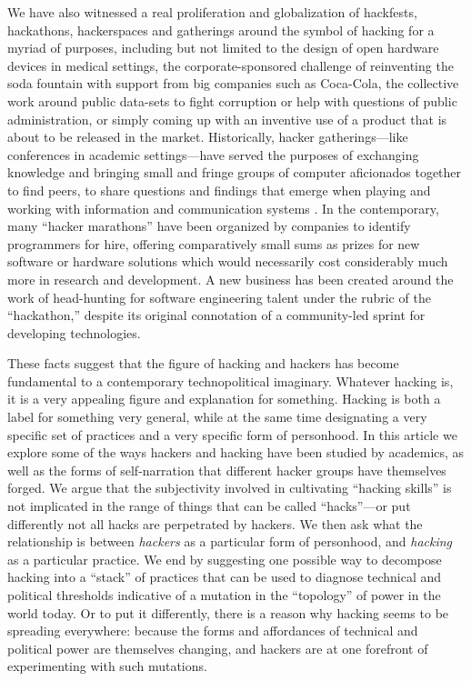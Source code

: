 \documentclass[10pt,letter,oneside]{scrartcl}
\begin{document}
We have also witnessed a real proliferation and globalization of hackfests,
hackathons, hackerspaces and gatherings around the symbol of hacking for a myriad of
purposes, including but not limited to the design of open hardware devices in
medical settings, the corporate-sponsored challenge of reinventing the soda
fountain with support from big companies such as Coca-Cola, the collective work
around public data-sets to fight corruption or help with questions of public
administration, or simply coming up with an inventive use of a product that is
about to be released in the market.  Historically, hacker gatherings---like
conferences in academic settings---have served the purposes of exchanging
knowledge and bringing small and fringe groups of computer aficionados together
to find peers, to share questions and findings that emerge when playing and
working with information and communication
systems \parencite{coleman_conference_2010}.  In the contemporary, many ``hacker
marathons'' have been organized by companies to identify programmers for hire,
offering comparatively small sums as prizes for new software or hardware
solutions which would necessarily cost considerably much more in research and
development.  A new business has been created around the work of head-hunting
for software engineering talent under the rubric of the ``hackathon,'' despite
its original connotation of a community-led sprint for developing technologies.

These facts suggest that the figure of hacking and hackers has become
fundamental to a contemporary technopolitical imaginary.  Whatever hacking is,
it is a very appealing figure and explanation for something.  Hacking is both a
label for something very general, while at the same time designating a very
specific set of practices and a very specific form of personhood.  In this
article we explore some of the ways hackers and hacking have been studied by
academics, as well as the forms of self-narration that different hacker groups
have themselves forged.  We argue that the subjectivity involved in cultivating
``hacking skills'' is not implicated in the range of things that can be called
``hacks''---or put differently not all hacks are perpetrated by hackers.  We
then ask what the relationship is between \emph{hackers} as a particular form of
personhood, and \emph{hacking} as a particular practice.  We end by suggesting
one possible way to decompose hacking into a ``stack'' of practices that can be
used to diagnose technical and political thresholds indicative of a mutation in
the ``topology'' of power in the world today.  Or to put it differently, there
is a reason why hacking seems to be spreading everywhere: because the forms and
affordances of technical and political power are themselves changing, and
hackers are at one forefront of experimenting with such mutations.
\end{document}

